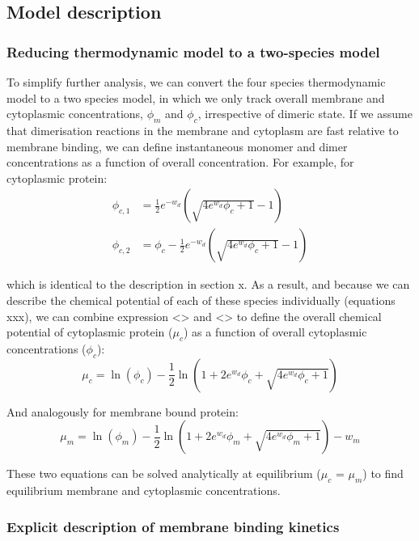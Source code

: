 \documentclass[12pt]{"article"}
\begin{document}
\subsection{Model description}

\subsubsection{Reducing thermodynamic model to a two-species model} 

To simplify further analysis, we can convert the four species thermodynamic model to a two species model, in which we only track overall membrane and cytoplasmic concentrations, $\phi_m$ and $\phi_c$, irrespective of dimeric state. If we assume that dimerisation reactions in the membrane and cytoplasm are fast relative to membrane binding, we can define instantaneous monomer and dimer concentrations as a function of overall concentration. For example, for cytoplasmic protein:
\begin{align}
\phi_{c,1} &= \frac{1}{2}e^{-w_d}\left(\sqrt{4e^{w_d}\phi_c + 1} - 1\right)\\
\phi_{c,2} &= \phi_c - \frac{1}{2}e^{-w_d}\left(\sqrt{4e^{w_d}\phi_c + 1} - 1\right)
\end{align}

which is identical to the description in section x. As a result, and because we can describe the chemical potential of each of these species individually (equations xxx), we can combine expression <> and <> to define the overall chemical potential of cytoplasmic protein ($\mu_c$) as a function of overall cytoplasmic concentrations ($\phi_c$):
\begin{equation}
\mu_c = \ln(\phi_c) - \frac{1}{2}\ln\left(1 + 2e^{w_d}\phi_c + \sqrt{4e^{w_d}\phi_c + 1}\right)
\end{equation}

And analogously for membrane bound protein: 
\begin{equation}
\mu_m = \ln(\phi_m) - \frac{1}{2}\ln\left(1 + 2e^{w_d}\phi_m + \sqrt{4e^{w_d}\phi_m + 1}\right) - w_m
\end{equation}

These two equations can be solved analytically at equilibrium ($\mu_c$ = $\mu_m$) to find equilibrium membrane and cytoplasmic concentrations.


\subsubsection{Explicit description of membrane binding kinetics} 
\end{document}
